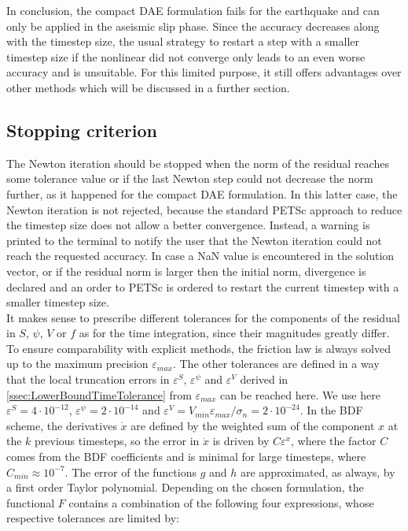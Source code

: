 In conclusion, the compact DAE formulation fails for the earthquake and can only be applied in the aseismic slip phase. Since the accuracy decreases along with the timestep size, the usual strategy to restart a step with a smaller timestep size if the nonlinear did not converge only leads to an even worse accuracy and is unsuitable. For this limited purpose, it still offers advantages over other methods which will be discussed in a further section.

\subsection{Stopping criterion}
The Newton iteration should be stopped when the norm of the residual reaches some tolerance value or if the last Newton step could not decrease the norm further, as it happened for the compact DAE formulation. In this latter case, the Newton iteration is not rejected, because the standard PETSc approach to reduce the timestep size does not allow a better convergence. Instead, a warning is printed to the terminal to notify the user that the Newton iteration could not reach the requested accuracy. In case a NaN value is encountered in the solution vector, or if the residual norm is larger then the initial norm, divergence is declared and an order to PETSc is ordered to restart the current timestep with a smaller timestep size. \\
It makes sense to prescribe different tolerances for the components of the residual in $S$, $\psi$, $V$ or $f$ as for the time integration, since their magnitudes greatly differ. To ensure comparability with explicit methods, the friction law is always solved up to the maximum precision $\varepsilon_{max}$. The other tolerances are defined in a way that the local truncation errors in $\varepsilon^S$, $\varepsilon^\psi$ and $\varepsilon^V$ derived in \autoref{ssec:LowerBoundTimeTolerance} from $\varepsilon_{max}$ can be reached here. We use here $\varepsilon^S=4\cdot10^{-12}$, $\varepsilon^\psi=2\cdot10^{-14}$ and $\varepsilon^V=V_{min}\varepsilon_{max}/\sigma_n=2\cdot10^{-24}$. In the BDF scheme, the derivatives $\dot{x}$ are defined by the weighted sum of the component $x$ at the $k$ previous timesteps, so the error in $\dot{x}$ is driven by $C\varepsilon^x$, where the factor $C$ comes from the BDF coefficients and is minimal for large timesteps, where $C_{min}\approx10^{-7}$. The error of the functions $g$ and $h$ are approximated, as always, by a first order Taylor polynomial. Depending on the chosen formulation, the functional $F$ contains a combination of the following four expressions, whose respective tolerances are limited by: 
